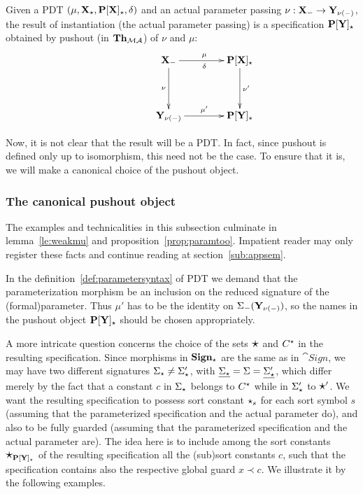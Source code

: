 \begin{definition}\label{def:actparPush}
Given a PDT $(\mu,{\bf X_\star},{\bf P[X]_\star},\delta)$ 
and an actual parameter passing $\nu:{\bf X_-}
\to 
{\bf Y_{\nu(-)}}$, the result of instantiation (the actual parameter passing)
 is a specification ${\bf P[Y]_\star}$ obtained by pushout (in ${\bf Th}_{{\mathcal{MA}}}$) of
$\nu$ and $\mu$:
\[ \xymatrix@R=0.6cm@C=0.6cm{
	&& \thr{X_\weak} \ar[rr]^{\mu}_\delta \ar[dd]_{\nu}
			&& \thr{P[X]_\cons} \ar[dd]^{\nu'}	\\
	\\
			&& \thr{Y_{\nu(\weak)}} \ar[rr]^{\mu'}%
			&& \thr{P[Y]_\cons}
								}
\]
\end{definition}
%
Now, it is not clear that the result will be a PDT. In fact, since pushout is
defined only up to isomorphism, this need not be the case. To ensure that it
is, we will make a canonical choice of the pushout object. 

\subsubsection{The canonical pushout object}\label{sub:canpush}
The examples and technicalities in this subsection culminate in
lemma~\ref{le:weakmu} and proposition~\ref{prop:paramtoo}. Impatient reader
may only register these facts and continue reading at section~\ref{sub:appsem}.

In the definition~\ref{def:parametersyntax} of PDT
we demand that the parameterization
morphism  be an inclusion on the reduced signature of the
(formal)parameter. Thus $\mu'$ has to be the identity on
$\Sigma_-({\bf Y_{\nu(-)}})$, so the names in the pushout object
${\bf P[Y]_\star}$ should be chosen appropriately.

A more intricate question concerns the choice of the sets $\mbox{\Large{$\star$}}$ and
$C^\star$ in the resulting specification. Since morphisms in
${\bf Sign_\star}$ are the same as in $\cat{Sign}$, we may have two different
signatures $\Sigma_\star\not=\Sigma'_\star$, with
$\underline{\Sigma_\star}=\Sigma=\underline{\Sigma'_\star}$, which differ merely by
the fact that a constant $c$ in $\Sigma_\star$ belongs to $C^\star$ while in
$\Sigma'_\star$ to $\mbox{\Large{$\star$}}'$. 
We want the resulting
specification to possess sort constant $\star_s$ for each sort symbol $s$
(assuming that the parameterized specification and the actual parameter do),
and also to be fully guarded (assuming that the parameterized
specification and the actual parameter are). The idea here is to include
among the sort constants $\mbox{\Large{$\star$}}_{{\bf P[Y]_{\star}}}$ of the resulting specification all the
(sub)sort constants $c$, such that the specification contains also the
respective global guard $x\prec c$. 
We illustrate it by the following examples.

